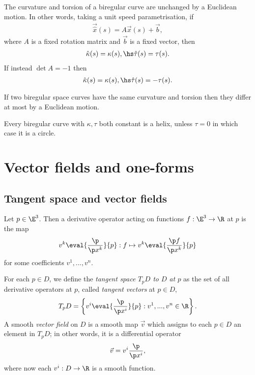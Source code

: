 \documentclass{article}
\begin{document}
\begin{proposition}[Notes 3.23]
	The curvature and torsion of a biregular curve are unchanged by a Euclidean motion.
	In other words, taking a unit speed parametrisation, if
	\begin{align*}
		\vec{\hat x}(s) = A\vec x(s) + \vec b,
	\end{align*}
	where $A$ is a fixed rotation matrix and $\vec b$ is a fixed vector, then
	\begin{align*}
		\hat\kappa(s) = \kappa(s), \hs \hat\tau(s)=\tau(s).
	\end{align*}
	If instead $\det A=-1$ then
	\begin{align*}
		\hat\kappa(s)=\kappa(s), \hs \hat\tau(s) = -\tau(s).
	\end{align*}
\end{proposition}

\begin{theorem}
	If two biregular space curves have the same curvature and torsion then they differ at most
	by a Euclidean motion.
\end{theorem}

\begin{corollary}
	Every biregular curve with $\kappa,\tau$ both constant is a helix, unless $\tau=0$ in
	which case it is a circle.
\end{corollary}

\section{Vector fields and one-forms}

\subsection{Tangent space and vector fields}

\begin{definition}
	Let $p\in\E^3$. Then a derivative operator acting on functions $f:\E^3\to\R$
	at $p$ is the map
	\begin{align*}
		v^k \eval{\frac{\p }{\p x^k}}{p} :
		f \mapsto v^k \eval{\frac{\p f}{\p x^k}}{p}
	\end{align*}
	for some coefficients $v^1,...,v^n$.
\end{definition}

\begin{definition}
	For each $p\in D$, we define the \emph{tangent space $T_pD$ to $D$ at $p$} as the
	set of all derivative operators at $p$, called \emph{tangent vectors} at $p\in D$,
	\begin{align*}
		T_p D =\left\lbrace v^i \eval{\frac{\p}{\p x^i}}{p}: v^1,...,v^n\in\R\right\rbrace.
	\end{align*}
	A smooth \emph{vector field} on $D$ is a smooth map $\vec v$ which assigns to each
	$p\in D$ an element in $T_pD$; in other words,
	it is a differential operator
	\begin{align*}
		\vec v = v^i\frac{\p}{\p x^i},
	\end{align*}
	where now each $v^i:D\to\R$ is a smooth function.
\end{definition}
\end{document}
